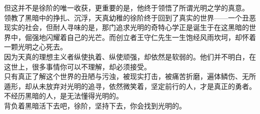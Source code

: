 \begin{multicols}{\theparacolNo}
但这并不是徐阶的唯一收获，更重要的是，他终于领悟了所谓光明之学的真意。\\

领教了黑暗中的挣扎、沉浮，天真幼稚的徐阶终于回到了真实的世界——一个丑恶现实的社会，但耐人寻味的是，那门追求光明的奇特心学正是诞生于在这黑暗的世界中，倔强地闪耀着自己的光芒。而创立者王守仁先生一生饱经风雨坎坷，却怀着一颗光明之心死去。\\

因为天真的理想主义者纵使执着、纵使顽强，却依然是软弱的。他们并不明白，在这世上，很多事情你可以不理解，却必须接受。\\

只有真正了解这个世界的丑陋与污浊，被现实打击，被痛苦折磨，遍体鳞伤、无所遁形，却从未放弃对光明的追寻，依然微笑着，坚定前行的人，才是真正的勇者。\\

不经历黑暗的人，是无法懂得光明的。\\

背负着黑暗活下去吧，徐阶，坚持下去，你会找到光明的。\\
\ifnum{}
	\end{multicols}
\fi
\newpage
